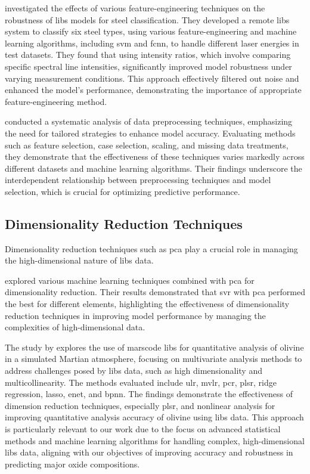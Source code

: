 \citet{jeonEffectsFeatureEngineering2024} investigated the effects of various feature-engineering techniques on the robustness of \gls{libs} models for steel classification.
They developed a remote \gls{libs} system to classify six steel types, using various feature-engineering and machine learning algorithms, including \gls{svm} and \gls{fcnn}, to handle different laser energies in test datasets.
They found that using intensity ratios, which involve comparing specific spectral line intensities, significantly improved model robustness under varying measurement conditions.
This approach effectively filtered out noise and enhanced the model's performance, demonstrating the importance of appropriate feature-engineering method.

\citet{Huang2015AnEA} conducted a systematic analysis of data preprocessing techniques, emphasizing the need for tailored strategies to enhance model accuracy.
Evaluating methods such as feature selection, case selection, scaling, and missing data treatments, they demonstrate that the effectiveness of these techniques varies markedly across different datasets and machine learning algorithms.
Their findings underscore the interdependent relationship between preprocessing techniques and model selection, which is crucial for optimizing predictive performance.

\subsection{Dimensionality Reduction Techniques}
Dimensionality reduction techniques such as \gls{pca} play a crucial role in managing the high-dimensional nature of \gls{libs} data.

\citet{rezaei_dimensionality_reduction} explored various machine learning techniques combined with \gls{pca} for dimensionality reduction. Their results demonstrated that \gls{svr} with \gls{pca} performed the best for different elements, highlighting the effectiveness of dimensionality reduction techniques in improving model performance by managing the complexities of high-dimensional data.

The study by \citet{liuComparisonQuantitativeAnalysis2022} explores the use of \gls{marscode} \gls{libs} for quantitative analysis of olivine in a simulated Martian atmosphere, focusing on multivariate analysis methods to address challenges posed by \gls{libs} data, such as high dimensionality and multicollinearity.
The methods evaluated include \gls{ulr}, \gls{mvlr}, \gls{pcr}, \gls{plsr}, ridge regression, \gls{lasso}, \gls{enet}, and \gls{bpnn}.
The findings demonstrate the effectiveness of dimension reduction techniques, especially \gls{plsr}, and nonlinear analysis for improving quantitative analysis accuracy of olivine using \gls{libs} data.
This approach is particularly relevant to our work due to the focus on advanced statistical methods and machine learning algorithms for handling complex, high-dimensional \gls{libs} data, aligning with our objectives of improving accuracy and robustness in predicting major oxide compositions.